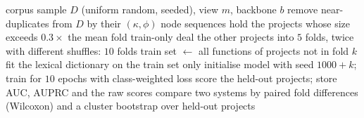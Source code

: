 \begin{algorithm}[t]
\caption{Cross-project evaluation of one (view, backbone) system}
\label{alg:protocol}
\begin{algorithmic}[1]
\REQUIRE corpus sample $D$ (uniform random, seeded), view $m$, backbone $b$
\STATE remove near-duplicates from $D$ by their $(\kappa,\phi)$ node sequences
\STATE hold the projects whose size exceeds $0.3\times$ the mean fold train-only
\STATE deal the other projects into $5$ folds, twice with different shuffles: $10$ folds
   \STATE train set $\leftarrow$ all functions of projects not in fold $k$
   \STATE fit the lexical dictionary on the train set only
   \STATE initialise model with seed $1000+k$; train for $10$ epochs with class-weighted loss
   \STATE score the held-out projects; store AUC, AUPRC and the raw scores
\ENDFOR
\STATE compare two systems by paired fold differences (Wilcoxon) and a cluster bootstrap over held-out projects
\end{algorithmic}
\end{algorithm}
